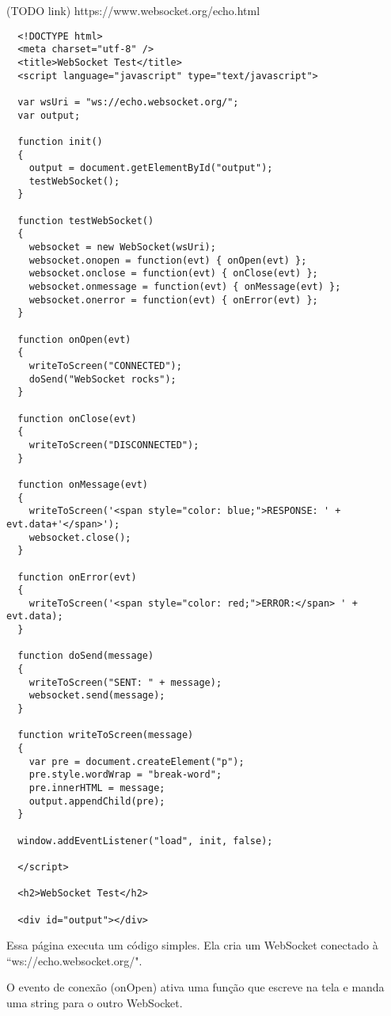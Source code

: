 \documentclass[a4paper,12pt]{article}
\begin{document}
(TODO link)
https://www.websocket.org/echo.html

\begin{small}
\begin{verbatim}
  <!DOCTYPE html>
  <meta charset="utf-8" />
  <title>WebSocket Test</title>
  <script language="javascript" type="text/javascript">

  var wsUri = "ws://echo.websocket.org/";
  var output;

  function init()
  {
    output = document.getElementById("output");
    testWebSocket();
  }

  function testWebSocket()
  {
    websocket = new WebSocket(wsUri);
    websocket.onopen = function(evt) { onOpen(evt) };
    websocket.onclose = function(evt) { onClose(evt) };
    websocket.onmessage = function(evt) { onMessage(evt) };
    websocket.onerror = function(evt) { onError(evt) };
  }

  function onOpen(evt)
  {
    writeToScreen("CONNECTED");
    doSend("WebSocket rocks");
  }

  function onClose(evt)
  {
    writeToScreen("DISCONNECTED");
  }

  function onMessage(evt)
  {
    writeToScreen('<span style="color: blue;">RESPONSE: ' + evt.data+'</span>');
    websocket.close();
  }

  function onError(evt)
  {
    writeToScreen('<span style="color: red;">ERROR:</span> ' + evt.data);
  }

  function doSend(message)
  {
    writeToScreen("SENT: " + message);
    websocket.send(message);
  }

  function writeToScreen(message)
  {
    var pre = document.createElement("p");
    pre.style.wordWrap = "break-word";
    pre.innerHTML = message;
    output.appendChild(pre);
  }

  window.addEventListener("load", init, false);

  </script>

  <h2>WebSocket Test</h2>

  <div id="output"></div>

\end{verbatim}
\end{small}


Essa página executa um código simples. Ela cria um WebSocket conectado à “ws://echo.websocket.org/".

O evento de conexão (onOpen) ativa uma função que escreve na tela e manda uma string para o outro WebSocket.
\end{document}
